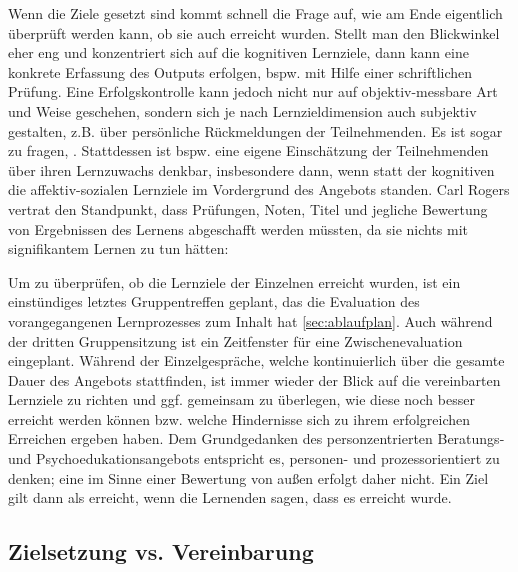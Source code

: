 \documentclass[
  twoside,
  parskip=half-,
]{scrreprt}
\begin{document}
Wenn die Ziele gesetzt sind kommt schnell die Frage auf, wie am Ende eigentlich überprüft werden kann, ob sie auch erreicht wurden. Stellt man den Blickwinkel eher eng und konzentriert sich auf die kognitiven Lernziele, dann kann eine konkrete Erfassung des Outputs erfolgen, bspw. mit Hilfe einer schriftlichen Prüfung. Eine Erfolgskontrolle kann jedoch nicht nur auf objektiv-messbare Art und Weise geschehen, sondern sich je nach Lernzieldimension auch subjektiv gestalten, z.B. über persönliche Rückmeldungen der Teilnehmenden. Es ist sogar zu fragen, . Stattdessen ist bspw. eine eigene Einschätzung der Teilnehmenden über ihren Lernzuwachs denkbar, insbesondere dann, wenn statt der kognitiven die affektiv-sozialen Lernziele im Vordergrund des Angebots standen. Carl Rogers vertrat den Standpunkt, dass Prüfungen, Noten, Titel und jegliche Bewertung von Ergebnissen des Lernens abgeschafft werden müssten, da sie nichts mit signifikantem Lernen zu tun hätten: 


\begin{praxis}
  Um zu überprüfen, ob die Lernziele der Einzelnen erreicht wurden, ist ein einstündiges letztes Gruppentreffen geplant, das die Evaluation des vorangegangenen Lernprozesses zum Inhalt hat \autoref{sec:ablaufplan}. Auch während der dritten Gruppensitzung ist ein Zeitfenster für eine Zwischenevaluation eingeplant. Während der Einzelgespräche, welche kontinuierlich über die gesamte Dauer des Angebots stattfinden, ist immer wieder der Blick auf die vereinbarten Lernziele zu richten und ggf. gemeinsam zu überlegen, wie diese noch besser erreicht werden können bzw. welche Hindernisse sich zu ihrem erfolgreichen Erreichen ergeben haben. Dem Grundgedanken des personzentrierten Beratungs- und Psychoedukationsangebots entspricht es, personen- und prozessorientiert zu denken; eine  im Sinne einer Bewertung von außen erfolgt daher nicht. Ein Ziel gilt dann als erreicht, wenn die Lernenden sagen, dass es erreicht wurde.
\end{praxis}



\subsection{Zielsetzung vs. Vereinbarung}
\end{document}
